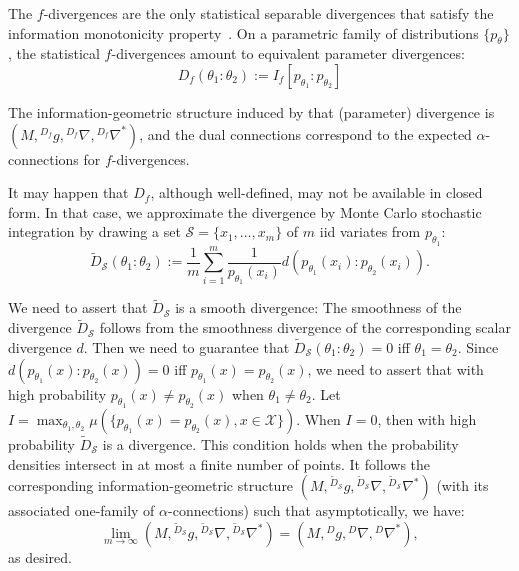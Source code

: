 \documentclass[graybox]{svmult}
\def\eqdef{:=}
\def\calS{\mathcal{S}}
\def\calX{\mathcal{X}}
\begin{document}
The $f$-divergences are the only statistical separable divergences that satisfy the information monotonicity property~\cite{IG-2016}.
On a parametric family of distributions $\{p_\theta\}$, the statistical $f$-divergences amount to equivalent parameter divergences:
\begin{equation}
D_f(\theta_1:\theta_2) \eqdef I_f[p_{\theta_1}:p_{\theta_2}]
\end{equation}

The information-geometric structure induced by that (parameter) divergence is 
$(M,{}^{D_f}g,{}^{D_f}\nabla,{}^{D_f}\nabla^*)$, and the dual connections correspond to the expected $\alpha$-connections\cite{IG-2016}  for $f$-divergences.

It may happen that $D_f$, although well-defined, may not be available in closed form.
In that case, we approximate the divergence by Monte Carlo stochastic integration by drawing a set $\calS=\{x_1,\ldots, x_m\}$ of $m$ iid variates from $p_{\theta_1}$:
\begin{equation}
\tilde{D}_\calS(\theta_1:\theta_2) \eqdef \frac{1}{m} \sum_{i=1}^m \frac{1}{p_{\theta_1}(x_i)} d(p_{\theta_1}(x_i):p_{\theta_2}(x_i)). 
\end{equation}

We need to assert that $\tilde{D}_\calS$ is a smooth divergence: 
The smoothness of the divergence $\tilde{D}_\calS$ follows from the smoothness divergence of the  corresponding scalar divergence $d$. Then we need to guarantee that $\tilde{D}_\calS(\theta_1:\theta_2)=0$ iff $\theta_1=\theta_2$.
Since $d(p_{\theta_1}(x):p_{\theta_2}(x))=0$ iff $p_{\theta_1}(x)=p_{\theta_2}(x)$, we need to assert that with high probability
$p_{\theta_1}(x)\not= p_{\theta_2}(x)$ when $\theta_1\not=\theta_2$.
Let $I=\max_{\theta_1,\theta_2} \mu(\{p_{\theta_1}(x)=p_{\theta_2}(x), x\in\calX\})$.
When $I=0$, then with high probability $\tilde{D}_\calS$ is a divergence.
This condition holds when the probability densities intersect in at most a finite number of points.
It follows the corresponding information-geometric structure 
$(M,{}^{\tilde{D}_\calS}g,{}^{\tilde{D}_\calS}\nabla,{}^{\tilde{D}_\calS}\nabla^*)$ (with its associated one-family of $\alpha$-connections) such that asymptotically, we have:
\begin{equation}
\lim_{m\rightarrow \infty}  (M,{}^{\tilde{D}_\calS}g,{}^{\tilde{D}_\calS}\nabla,{}^{\tilde{D}_\calS}\nabla^*) 
=
(M,{}^Dg,{}^D\nabla,{}^D\nabla^*),
\end{equation}
as desired.
\end{document}
